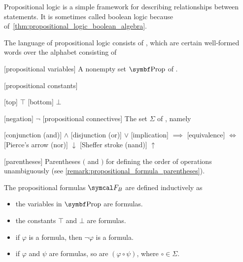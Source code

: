 \begin{definition}\label{def:propositional_logic_language}\cite[102]{OpenLogic20201202}
  Propositional logic is a simple framework for describing relationships between statements. It is sometimes called boolean logic because of~\cref{thm:propositional_logic_boolean_algebra}.

  The language of propositional logic consists of , which are certain well-formed words over the alphabet consisting of
  \begin{description}
    [propositional variables] A nonempty set \( \Cat{Prop} \) of .

    [propositional constants]\mbox{}
    \begin{description}
      [top] \( \top \)
      [bottom] \( \bot \)
    \end{description}

    [negation] \( \neg \)
    [propositional connectives] The set \( \Sigma \) of , namely
    \begin{description}
      [conjunction (and)] \( \land \)
      [disjunction (or)] \( \lor \)
      [implication] \( \implies \)
      [equivalence] \( \iff \)
      [Pierce's arrow (nor)] \( \downarrow \)
      [Sheffer stroke (nand)] \( \uparrow \)
    \end{description}

    [parentheses] Parentheses \( ( \) and \( ) \) for defining the order of operations unambiguously (see \cref{remark:propositional_formula_parentheses}).
  \end{description}

  The propositional formulas \( \Cal{F}_B \) are defined inductively as
  \begin{itemize}
    \item the variables in \( \Cat{Prop} \) are formulas.
    \item the constants \( \top \) and \( \bot \) are formulas.
    \item if \( \varphi \) is a formula, then \( \neg \varphi \) is a formula.
    \item if \( \varphi \) and \( \psi \) are formulas, so are \( (\varphi \circ \psi) \), where \( \circ \in \Sigma \).
  \end{itemize}


\end{definition}
